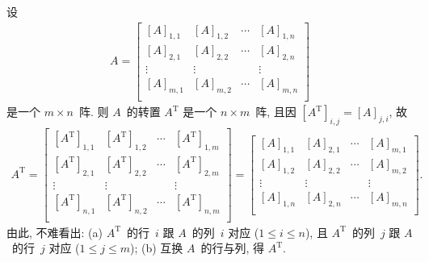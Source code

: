 \documentclass[../libro.tex]{subfiles}
\begin{document}
\begin{example}
    设
    \begin{align*}
        A =
        \begin{bmatrix}
            [A]_{1,1} & [A]_{1,2} & \cdots & [A]_{1,n} \\
            [A]_{2,1} & [A]_{2,2} & \cdots & [A]_{2,n} \\
            \vdots    & \vdots    & {}     & \vdots    \\
            [A]_{m,1} & [A]_{m,2} & \cdots & [A]_{m,n} \\
        \end{bmatrix}
    \end{align*}
    是一个 \(m \times n\)~阵.
    则 \(A\)~的转置 \(A^{\mathrm{T}}\)
    是一个 \(n \times m\)~阵,
    且因 \([A^{\mathrm{T}}]_{i,j} = [A]_{j,i}\),
    故
    \begin{align*}
        A^{\mathrm{T}}
        =
        \begin{bmatrix}
            [A^{\mathrm{T}}]_{1,1} & [A^{\mathrm{T}}]_{1,2} &
            \cdots                 & [A^{\mathrm{T}}]_{1,m}   \\
            [A^{\mathrm{T}}]_{2,1} & [A^{\mathrm{T}}]_{2,2} &
            \cdots                 & [A^{\mathrm{T}}]_{2,m}   \\
            \vdots                 & \vdots                 &
            {}                     & \vdots                   \\
            [A^{\mathrm{T}}]_{n,1} & [A^{\mathrm{T}}]_{n,2} &
            \cdots                 & [A^{\mathrm{T}}]_{n,m}   \\
        \end{bmatrix}
        =
        \begin{bmatrix}
            [A]_{1,1} & [A]_{2,1} & \cdots & [A]_{m,1} \\
            [A]_{1,2} & [A]_{2,2} & \cdots & [A]_{m,2} \\
            \vdots    & \vdots    & {}     & \vdots    \\
            [A]_{1,n} & [A]_{2,n} & \cdots & [A]_{m,n} \\
        \end{bmatrix}.
    \end{align*}
    由此, 不难看出:
    (a)
    \(A^{\mathrm{T}}\)~的行~\(i\)
    跟 \(A\)~的列~\(i\) 对应
    (\(1 \leq i \leq n\)),
    且
    \(A^{\mathrm{T}}\)~的列~\(j\)
    跟 \(A\)~的行~\(j\) 对应
    (\(1 \leq j \leq m\));
    (b)
    互换 \(A\)~的行与列,
    得 \(A^{\mathrm{T}}\).
\end{example}
\end{document}
